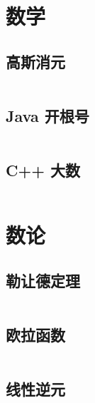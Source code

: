 \documentclass[titlepage,landscape,a4paper,10pt]{article}
\begin{document}
\begin{multicols}{2}
\begin{spacing}{0.8}
\section{数学}

\subsection{高斯消元}
\inputminted{cpp}{Math/高斯消元.cpp}

\subsection{Java 开根号}
\inputminted{java}{Math/Java开根号.java}

\subsection{C++ 大数}
\inputminted{cpp}{Math/C++大数.cpp}

\section{数论}

\subsection{勒让德定理}
\inputminted{cpp}{NumberTheory/Legendre.cpp}

\subsection{欧拉函数}
\inputminted{cpp}{NumberTheory/欧拉函数.cpp}

\subsection{线性逆元}



\end{spacing}
\end{multicols}
\end{document}
